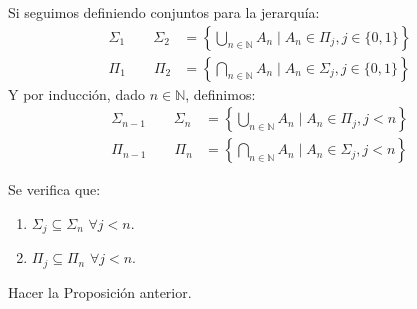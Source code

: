 Si seguimos definiendo conjuntos para la jerarquía:
\begin{align*}
    \Sigma_1 \qquad \Sigma_2 &= \left\{\bigcup_{n\in \mathbb{N}} A_n \mid A_n \in \Pi_j, j \in \{0,1\}\right\} \\
    \Pi_1 \qquad \Pi_2 &= \left\{\bigcap_{n\in \mathbb{N}}A_n \mid A_n\in \Sigma_j, j\in \{0,1\}\right\}
\end{align*}
Y por inducción, dado $n\in \mathbb{N}$, definimos:
\begin{align*}
    \Sigma_{n-1} \qquad \Sigma_n &= \left\{\bigcup_{n\in \mathbb{N}} A_n \mid A_n \in \Pi_j, j<n\right\} \\
    \Pi_{n-1} \qquad \Pi_n &= \left\{\bigcap_{n\in \mathbb{N}} A_n \mid A_n \in \Sigma_j, j<n\right\}
\end{align*}

\begin{prop}
    Se verifica que:
    \begin{enumerate}
        \item $\Sigma_j \subseteq \Sigma_n$ $\forall j<n$.
        \item $\Pi_j \subseteq \Pi_n$ $\forall j<n$.
    \end{enumerate}
\end{prop}

\begin{ejercicio}
    Hacer la Proposición anterior.
\end{ejercicio}

